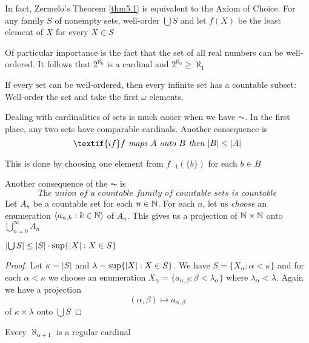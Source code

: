 \documentclass[11pt]{article}
\begin{document}
In fact, Zermelo's Theorem \ref{thm5.1} is equivalent to the Axiom of Choice. For
any family \(S\) of nonempty sets, well-order \(\bigcup S\) and let \(f(X)\) be the
least element of \(X\) for every \(X\in S\)

Of particular importance is the fact that the set of all real numbers can be
well-ordered. It follows that \(2^{\aleph_0}\) is a cardinal and
\(2^{\aleph_0}\ge\aleph_1\) 

If every set can be well-ordered, then every infinite set has a countable
subset: Well-order the set and take the first \(\omega\) elements.

Dealing with cardinalities of sets is much easier when we have \(\AC\). In the
first place, any two sets have comparable cardinals. Another consequence is
\begin{equation*}
\textif{if } f\textit{ maps }A\textit{ onto }B\textit{ then }\abs{B}\le\abs{A}
\end{equation*}

This is done by choosing one element from \(f_{-1}(\{b\})\) for each \(b\in B\)

Another consequence of the \(\AC\) is 
\begin{equation*}
\textit{The union of a countable family of countable sets is countable}
\end{equation*}
Let \(A_n\) be a countable set for each \(n\in\mathbb{N}\). For each \(n\), let us \emph{choose}
an enumeration \(\langle a_{n,k}:k\in\mathbb{N}\rangle\) of \(A_n\). This gives us a projection
of \(\mathbb{N}\times\mathbb{N}\) onto \(\bigcup_{n=0}^{\infty}A_n\)

\begin{lemma}[]
\(\abs{\bigcup S}\le\abs{S}\cdot\sup\{\abs{X}:X\in S\}\)
\end{lemma}

\begin{proof}
Let \(\kappa=\abs{S}\) and \(\lambda=\sup\{\abs{X}:X\in S\}\). We have
\(S=\{X_\alpha:\alpha<\kappa\}\) and for each \(\alpha<\kappa\) we choose an enumeration
\(X_\alpha=\{a_{\alpha,\beta}:\beta<\lambda_\alpha\}\) where \(\lambda_\alpha<\lambda\).
Again we have a projection
\begin{equation*}
(\alpha,\beta)\mapsto a_{\alpha,\beta}
\end{equation*}
of \(\kappa\times\lambda\) onto \(\bigcup S\)
\end{proof}

\begin{corollary}[]
Every \(\aleph_{\alpha+1}\) is a regular cardinal
\end{corollary}
\end{document}

